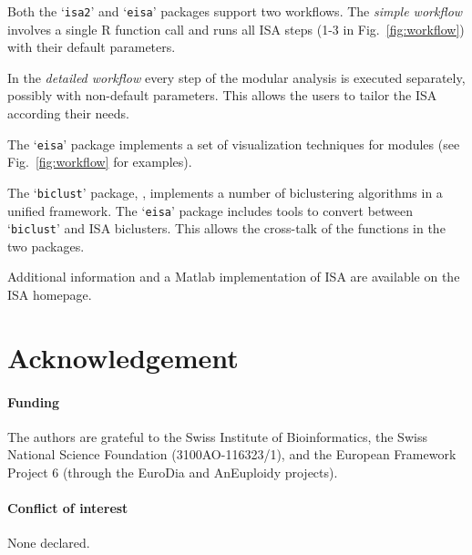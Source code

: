 \documentclass{bioinfo}
\newcommand{\Rpackage}[1]{`\texttt{#1}'}
\begin{document}
Both the \Rpackage{isa2} and \Rpackage{eisa} packages support two
workflows. The \emph{simple workflow} involves a single R function
call and runs all ISA steps (1-3 in Fig.~\ref{fig:workflow}) with
their default parameters.

In the \emph{detailed workflow} every step of the modular analysis 
is executed separately, possibly with non-default parameters. This allows
the users to tailor the ISA according their needs.


The \Rpackage{eisa} package implements a set of visualization
techniques for modules (see Fig.~\ref{fig:workflow} for examples).

The \Rpackage{biclust} package, \citep{biclust}, implements a number of
biclustering algorithms in a unified framework. The \Rpackage{eisa}
package includes tools to convert between \Rpackage{biclust} and ISA
biclusters. This allows the cross-talk of the functions in the two
packages.

Additional information and a Matlab implementation of ISA are
available on the ISA homepage. 

\vspace*{-0.5cm}
\section*{Acknowledgement}

\paragraph{Funding\textcolon} The authors are grateful to the Swiss
Institute of Bioinformatics, the Swiss National Science Foundation
(3100AO-116323/1), and the European Framework Project 6 (through
the EuroDia and AnEuploidy projects).
\paragraph{Conflict of interest\textcolon} None declared.



\end{document}
